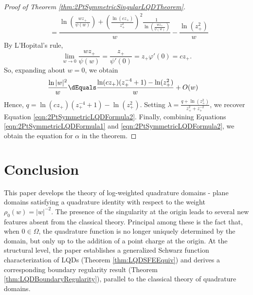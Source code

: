 \documentclass{article}
\numberwithin{equation}{section}
\begin{document}
\begin{proof}[Proof of Theorem \ref{thm:2PtSymmetricSingularLQDTheorem}]
\begin{align*}
    &=\dfrac{\ln\left(\frac{wz_{+}}{\psi(w)}\right)+\left(\frac{\ln(cz_{+})}{z_+^2}\right)^2\frac{1}{\ln\left(\frac{wz_{+}}{\psi(w)}\right)}}{w}-\dfrac{\ln(z_+^2)}{w}
\end{align*}
By L'Hopital's rule,
$$\lim_{w\to0}\dfrac{wz_{+}}{\psi(w)}=\dfrac{z_{+}}{\psi'(0)}=z_{+}\varphi'(0)=cz_{+}.$$
So, expanding about $w=0$, we obtain
\begin{align*}
    \dfrac{\ln|w|^2}{w}&\dEquals\dfrac{\ln(cz_{+})(z_+^{-4}+1)-\ln(z_+^2)}{w}+O(w)
\end{align*}
Hence, $q=\ln(cz_{+})(z_+^{-4}+1)-\ln(z_+^2)$. Setting $\lambda=\frac{q+\ln(z_+^2)}{z_+^2+z_+^{-2}}$, we recover Equation \ref{eqn:2PtSymmetricLQDFormula2}. Finally, combining Equations \ref{eqn:2PtSymmetricLQDFormula1} and \ref{eqn:2PtSymmetricLQDFormula2}, we obtain the equation for $\alpha$ in the theorem.
\end{proof}








\section{Conclusion}

This paper develops the theory of log-weighted quadrature domains - plane domains satisfying a quadrature identity with respect to the weight $\rho_0(w)=|w|^{-2}$. The presence of the singularity at the origin leads to several new features absent from the classical theory. Principal among these is the fact that, when $0\in\Omega$, the quadrature function is no longer uniquely determined by the domain, but only up to the addition of a point charge at the origin. At the structural level, the paper establishes a generalized Schwarz function characterization of LQDs (Theorem \ref{thm:LQDSFEEquiv}) and derives a corresponding boundary regularity result (Theorem \ref{thm:LQDBoundaryRegularity}), parallel to the classical theory of quadrature domains. 
\end{document}
